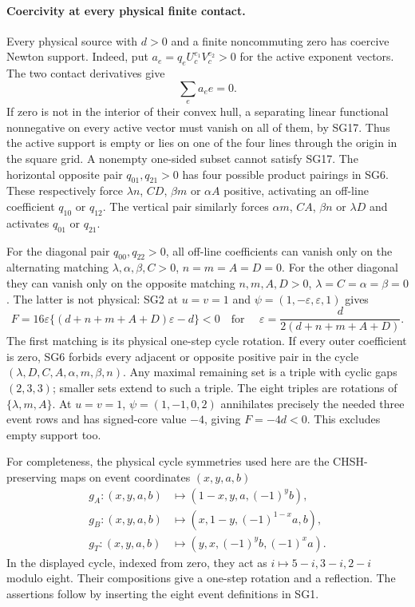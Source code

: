 \paragraph{Coercivity at every physical finite contact.}
Every physical source with $d>0$ and a finite noncommuting zero has
coercive Newton support.  Indeed, put
$a_e=q_eU_c^{e_1}V_c^{e_2}>0$ for the active exponent vectors.
The two contact derivatives give
\[
                         \sum_e a_e e=0.                \tag{SG17}
\]
If zero is not in the interior of their convex hull, a separating
linear functional nonnegative on every active vector must vanish
on all of them, by SG17.  Thus the active support is empty or lies
on one of the four lines through the origin in the square grid.
A nonempty one-sided subset cannot satisfy SG17.  The horizontal
opposite pair $q_{01},q_{21}>0$ has four possible product pairings
in SG6.  These respectively force $\lambda n$, $CD$, $\beta m$
or $\alpha A$ positive, activating an off-line coefficient
$q_{10}$ or $q_{12}$.  The vertical pair similarly forces
$\alpha m$, $CA$, $\beta n$ or $\lambda D$ and activates
$q_{01}$ or $q_{21}$.

For the diagonal pair $q_{00},q_{22}>0$, all off-line coefficients
can vanish only on the alternating matching
$\lambda,\alpha,\beta,C>0$, $n=m=A=D=0$.
For the other diagonal they can vanish only on the opposite matching
$n,m,A,D>0$, $\lambda=C=\alpha=\beta=0$.
The latter is not physical: SG2 at $u=v=1$ and
$\psi=(1,-\varepsilon,\varepsilon,1)$ gives
\[
 F=16\varepsilon\{(d+n+m+A+D)\varepsilon-d\}<0
 \quad\text{for }\quad
 \varepsilon=\frac{d}{2(d+n+m+A+D)}.
\]
The first matching is its physical one-step cycle rotation.
If every outer coefficient is zero, SG6 forbids every adjacent or
opposite positive pair in the cycle
$(\lambda,D,C,A,\alpha,m,\beta,n)$.
Any maximal remaining set is a triple with cyclic gaps $(2,3,3)$;
smaller sets extend to such a triple.  The eight triples are rotations
of $\{\lambda,m,A\}$.  At $u=v=1$, $\psi=(1,-1,0,2)$
annihilates precisely the needed three event rows and has signed-core
value $-4$, giving $F=-4d<0$.  This excludes empty support too.

For completeness, the physical cycle symmetries used here are the
CHSH-preserving maps on event coordinates $(x,y,a,b)$
\[
\begin{split}
g_A:(x,y,a,b)&\mapsto(1-x,y,a,(-1)^yb),\\
g_B:(x,y,a,b)&\mapsto(x,1-y,(-1)^{1-x}a,b),\\
g_T:(x,y,a,b)&\mapsto(y,x,(-1)^yb,(-1)^xa).
\end{split}
\]
In the displayed cycle, indexed from zero, they act as
$i\mapsto5-i,3-i,2-i$ modulo eight.  Their compositions give
a one-step rotation and a reflection.  The assertions follow
by inserting the eight event definitions in SG1.

